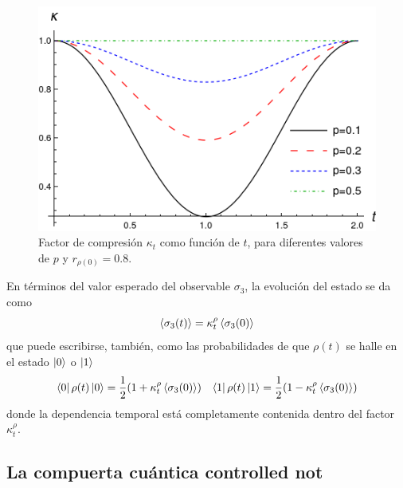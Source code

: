 \begin{figure}[h!]
  \centering
  \includegraphics[width=0.6\linewidth]{chapter3/figures_toy/ContractionFactorSWAP_z=0.8_t=0_to_t=2.png}
  \caption{Factor de compresión $\kappa_{t}$ como función de $t$, para diferentes valores de $p$ y $r_{\rho(0)}=0.8$.}
  \label{fig:SWAPFactor2Dt}
\end{figure}

En términos del valor esperado del observable $\sigma_{3}$, la evolución del estado se da como
\begin{equation}
  \expval{\sigma_{3}(t)}=\kappa_{t}^{\rho}\expval{\sigma_{3}(0)}
\end{equation}
que puede escribirse, también, como las probabilidades de que $\rho(t)$ se halle en el estado $\ket{0}$ o $\ket{1}$
 \begin{align}
  \bra{0}\rho(t)\ket{0}=\frac{1}{2}(1+\kappa_{t}^{\rho}\expval{\sigma_{3}(0)}) && \bra{1}\rho(t)\ket{1}=\frac{1}{2}(1-\kappa_{t}^{\rho}\expval{\sigma_{3}(0)})
 \end{align}
 donde la dependencia temporal está completamente contenida dentro del factor $\kappa_{t}^{\rho}$. 


\subsection{La compuerta cuántica controlled not}

